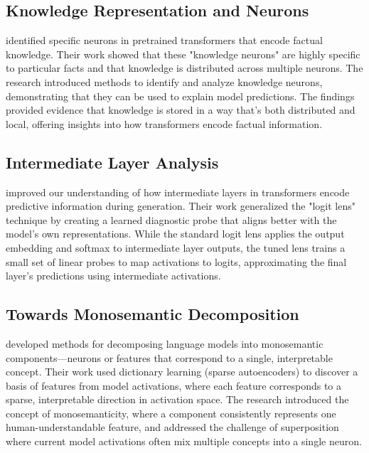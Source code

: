 \subsection{Knowledge Representation and Neurons}

\citet{dai2022knowledge} identified specific neurons in pretrained transformers that encode factual knowledge. Their work showed that these "knowledge neurons" are highly specific to particular facts and that knowledge is distributed across multiple neurons. The research introduced methods to identify and analyze knowledge neurons, demonstrating that they can be used to explain model predictions. The findings provided evidence that knowledge is stored in a way that's both distributed and local, offering insights into how transformers encode factual information.

\subsection{Intermediate Layer Analysis}

\citet{belrose2023eliciting} improved our understanding of how intermediate layers in transformers encode predictive information during generation. Their work generalized the "logit lens" technique by creating a learned diagnostic probe that aligns better with the model's own representations. While the standard logit lens applies the output embedding and softmax to intermediate layer outputs, the tuned lens trains a small set of linear probes to map activations to logits, approximating the final layer's predictions using intermediate activations.

\subsection{Towards Monosemantic Decomposition}

\citet{bircken2023monosemanticity} developed methods for decomposing language models into monosemantic components—neurons or features that correspond to a single, interpretable concept. Their work used dictionary learning (sparse autoencoders) to discover a basis of features from model activations, where each feature corresponds to a sparse, interpretable direction in activation space. The research introduced the concept of monosemanticity, where a component consistently represents one human-understandable feature, and addressed the challenge of superposition where current model activations often mix multiple concepts into a single neuron.

